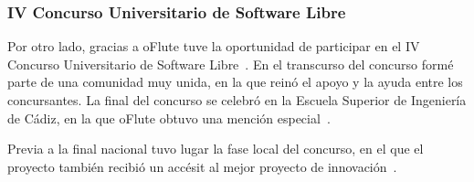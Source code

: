 \documentclass[a4paper,11pt]{article}
\begin{document}
\subsubsection{IV Concurso Universitario de Software Libre}

Por otro lado, gracias a oFlute tuve la oportunidad de participar en el IV
Concurso Universitario de Software Libre~\cite{cusl}. En el transcurso del
concurso formé parte de una comunidad muy unida, en la que reinó el apoyo y la
ayuda entre los concursantes. La final del concurso se celebró en la Escuela
Superior de Ingeniería de Cádiz, en la que oFlute obtuvo una mención
especial~\cite{cusl2}.

Previa a la final nacional tuvo lugar la fase local del concurso, en el que el
proyecto también recibió un accésit al mejor proyecto de
innovación~\cite{cusllocal}.



\end{document}
